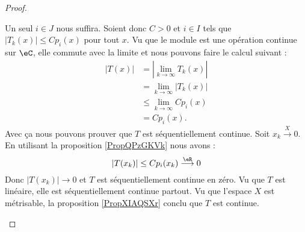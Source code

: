 \begin{proof}
\begin{subproof}
		Un seul \( i\in J\) nous suffira. Soient donc \( C>0\) et \( i\in I\) tels que \( | T_k(x) |\leq C p_i(x)\) pour tout \( x\). Vu que le module est une opération continue sur \( \eC\), elle commute avec la limite et nous pouvons faire le calcul suivant :
		\begin{subequations}
			\begin{align}
				| T(x) | & =| \lim_{k\to \infty} T_k(x) |  \\
				         & =\lim_{k\to \infty} | T_k(x) |  \\
				         & \leq \lim_{k\to \infty} Cp_i(x) \\
				         & =Cp_i(x).
			\end{align}
		\end{subequations}
		Avec ça nous pouvons prouver que \( T\) est séquentiellement continue. Soit \( x_k\stackrel{X}{\longrightarrow}0\). En utilisant la proposition \ref{PropQPzGKVk} nous avons :
		\begin{equation}
			| T(x_k) |\leq C p_i(x_k)\stackrel{\eR}{\longrightarrow}0
		\end{equation}
		Donc \( | T(x_k) |\to 0\) et \( T\) est séquentiellement continue en zéro. Vu que \( T\) est linéaire, elle est séquentiellement continue partout.
		\spitem[Continue]
		Vu que l'espace \( X\) est métrisable, la proposition \ref{PropXIAQSXr} conclu que \( T\) est continue.


\end{subproof}
\end{proof}
